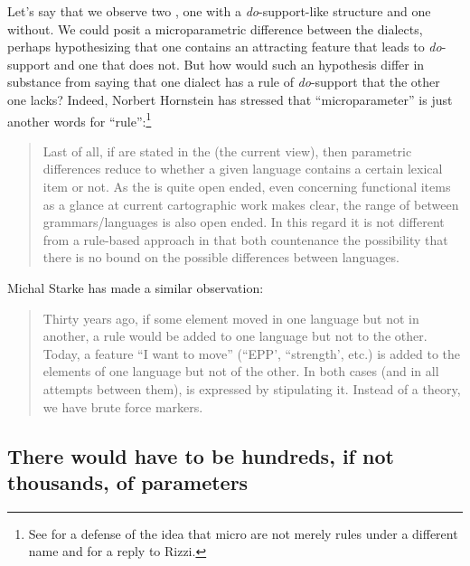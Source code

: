 \documentclass[output=paper,
modfonts
]{LSP/langsci}
\begin{document}
Let's say that we observe two  , one with a
\emph{do}-support-like structure and one without. We could posit a
microparametric difference between the dialects, perhaps hypothesizing
that one contains an attracting feature that leads to \emph{do}-support
and one that does not. But how would such an hypothesis differ in
substance from saying that one dialect has a rule of \emph{do}-support
that the other one lacks? Indeed, Norbert Hornstein has stressed that
``microparameter'' is just another words for ``rule'':\footnote{See \citet[22--27]{rizzi2014} for a defense of the idea that micro are not
  merely rules under a different name and \citet{boeckx2014} for a reply to
  Rizzi.}

\begin{quote}
Last of all, if  are stated in the  (the current view),
then parametric differences reduce to whether a given language contains
a certain lexical item or not. As the  is quite open ended, even
concerning functional items as a glance at current cartographic work
makes clear, the range of  between grammars/languages is also
open ended. In this regard it is not different from a rule-based
approach in that both countenance the possibility that there is no bound
on the possible differences between languages. \citep[165]{hornstein2009}
\end{quote}

Michal Starke has made a similar observation:

\begin{quote}
Thirty years ago, if some element moved in one language but not in
another, a  rule would be added to one language but not to the
other. Today, a feature ``I want to move'' (``EPP', ``strength', etc.) is
added to the elements of one language but not of the other. In both
cases (and in all attempts between them),  is expressed by
stipulating it. Instead of a theory, we have brute force markers.
\citep[140]{starke2014}
\end{quote}

\subsection{There would have to be hundreds, if not thousands, of parameters}
\end{document}
